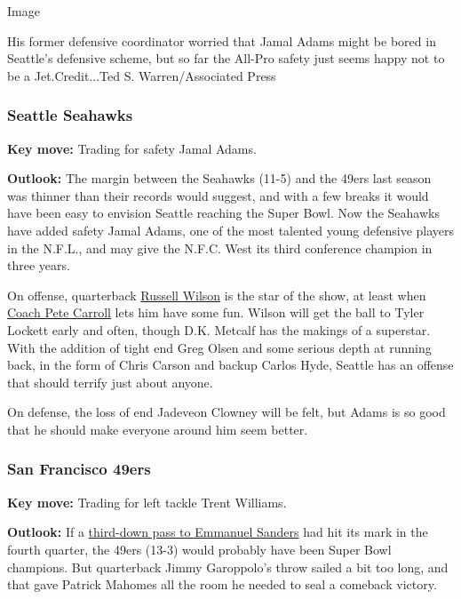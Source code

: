 Image

His former defensive coordinator worried that Jamal Adams might be bored
in Seattle's defensive scheme, but so far the All-Pro safety just seems
happy not to be a Jet.Credit...Ted S. Warren/Associated Press

\hypertarget{seattle-seahawks}{%
\subsubsection{\texorpdfstring{\textbf{Seattle
Seahawks}}{Seattle Seahawks}}\label{seattle-seahawks}}

\textbf{Key move:} Trading for safety Jamal Adams.

\textbf{Outlook:} The margin between the Seahawks (11-5) and the 49ers
last season was thinner than their records would suggest, and with a few
breaks it would have been easy to envision Seattle reaching the Super
Bowl. Now the Seahawks have added safety Jamal Adams, one of the most
talented young defensive players in the N.F.L., and may give the N.F.C.
West its third conference champion in three years.

On offense, quarterback
\href{https://www.nytimes3xbfgragh.onion/2020/01/04/sports/football/russell-wilson-nfl-playoffs-2019.html}{Russell
Wilson} is the star of the show, at least when
\href{https://www.nytimes3xbfgragh.onion/2020/01/09/sports/football/seattle-seahawks-pete-carroll.html}{Coach
Pete Carroll} lets him have some fun. Wilson will get the ball to Tyler
Lockett early and often, though D.K. Metcalf has the makings of a
superstar. With the addition of tight end Greg Olsen and some serious
depth at running back, in the form of Chris Carson and backup Carlos
Hyde, Seattle has an offense that should terrify just about anyone.

On defense, the loss of end Jadeveon Clowney will be felt, but Adams is
so good that he should make everyone around him seem better.

\hypertarget{san-francisco-49ers}{%
\subsubsection{\texorpdfstring{\textbf{San Francisco
49ers}}{San Francisco 49ers}}\label{san-francisco-49ers}}

\textbf{Key move:} Trading for left tackle Trent Williams.

\textbf{Outlook:} If a
\href{https://sports.yahoo.com/emmanuel-sanders-like-most-49-ers-fans-still-thinks-about-that-overthrown-jimmy-g-pass-late-in-super-bowl-loss-223945303.html}{third-down
pass to Emmanuel Sanders} had hit its mark in the fourth quarter, the
49ers (13-3) would probably have been Super Bowl champions. But
quarterback Jimmy Garoppolo's throw sailed a bit too long, and that gave
Patrick Mahomes all the room he needed to seal a comeback victory.


